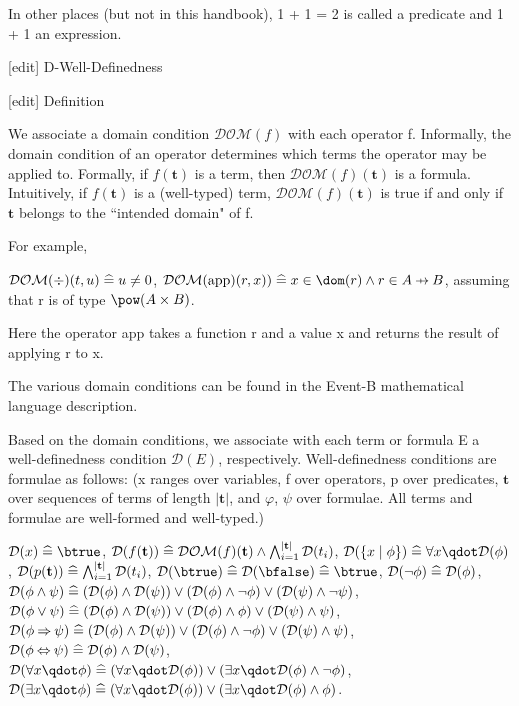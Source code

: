 In other places (but not in this handbook), 1 + 1 = 2 is called a predicate and 1 + 1 an expression.

[edit] D-Well-Definedness

[edit] Definition

We associate a domain condition $\mathcal{DOM}(f)$ with each operator f. Informally, the domain condition of an operator determines which terms the operator may be applied to. Formally, if $f(\mathbf{t})$ is a term, then $\mathcal{DOM}(f)(\mathbf{t})$ is a formula. Intuitively, if $f(\mathbf{t})$ is a (well-typed) term, $\mathcal{DOM}(f)(\mathbf{t})$ is true if and only if $\mathbf{t}$ belongs to the ``intended domain" of f.

For example,

    $\mathcal{DOM}(\div)(t, u) \mathrel{\widehat=} u \neq 0$,
    $\mathcal{DOM}(\mathrm{app})(r,x)) \defi x \in \dom(r) \land r \in A \pfun B$, assuming that r is of type $\pow(A \times B)$. 

Here the operator app takes a function r and a value x and returns the result of applying r to x.

The various domain conditions can be found in the Event-B mathematical language description.

Based on the domain conditions, we associate with each term or formula E a well-definedness condition $\mathcal{D}(E)$, respectively. Well-definedness conditions are formulae as follows:
(x ranges over variables, f over operators, p over predicates, $\mathbf{t}$ over sequences of terms of length $|\mathbf{t}|$, and $φ$, $ψ$ over formulae. All terms and formulae are well-formed and well-typed.)

    $\mathcal{D}(x)\defi \btrue$,
    $\mathcal{D}(f(\mathbf{t}))\mathrel{\widehat=} \mathcal{DOM}(f)(\mathbf{t}) \land \bigwedge_{i=1}^{|\mathbf{t}|} \mathcal{D}(t_i)$,
    $\mathcal{D}(\{x\mid \phi\})\defi \forall x\qdot \mathcal{D}(\phi)$,
    $\mathcal{D}(p(\mathbf{t}))\mathrel{\widehat=} \bigwedge_{i=1}^{|\mathbf{t}|} \mathcal{D}(t_i)$,
    $\mathcal{D}(\btrue) \defi \mathcal{D}(\bfalse) \defi \btrue$,
    $\mathcal{D}(\lnot\phi) \mathrel{\widehat=} \mathcal{D}(\phi)$,
    $\mathcal{D}(\phi\land\psi)\mathrel{\widehat=} (\mathcal{D}(\phi) \land \mathcal{D}(\psi)) \lor (\mathcal{D}(\phi) \land \lnot\phi) \lor (\mathcal{D}(\psi) \land \lnot\psi)$,
    $\mathcal{D}(\phi\lor\psi)\mathrel{\widehat=} (\mathcal{D}(\phi) \land \mathcal{D}(\psi)) \lor (\mathcal{D}(\phi) \land \phi) \lor (\mathcal{D}(\psi) \land \psi)$,
    $\mathcal{D}(\phi\mathbin\Rightarrow\psi)\mathrel{\widehat=} (\mathcal{D}(\phi) \land \mathcal{D}(\psi)) \lor (\mathcal{D}(\phi) \land \lnot\phi) \lor (\mathcal{D}(\psi) \land \psi)$,
    $\mathcal{D}(\phi\mathbin\Leftrightarrow\psi)\mathrel{\widehat=} \mathcal{D}(\phi) \land \mathcal{D}(\psi)$,
    $\mathcal{D}(\forall x\qdot \phi)\defi (\forall x \qdot \mathcal{D}(\phi)) \lor (\exists x \qdot \mathcal{D}(\phi) \land \lnot \phi)$,
    $\mathcal{D}(\exists x\qdot \phi)\defi (\forall x \qdot \mathcal{D}(\phi)) \lor (\exists x \qdot \mathcal{D}(\phi) \land \phi)$. 

